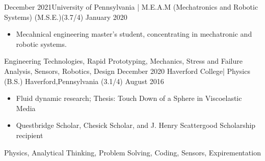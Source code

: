 %
%
%


\begin{experiences}
 \experience
    {December 2021}{University of Pennsylvania | M.E.A.M  (Mechatronics and Robotic Systems) }{(M.S.E.)}{(3.7/4)}
    {January 2020} {
                      \begin{itemize}
                        \item Mecahnical engineering master's student, concentrating in mechatronic and robotic systems.                                                                            
                      \end{itemize}
                    }
                     {Engineering Technologies, Rapid Prototyping, Mechanics, Stress and Failure Analysis, Sensors, Robotics, Design}
  \emptySeparator
  \experience
    {December 2020}   {Haverford College| Physics (B.S.) }{Haverford,Pennsylvania }{(3.1/4)}
    {August 2016} {
                      \begin{itemize}
    			    \item Fluid dynamic research; Thesis: Touch Down of a Sphere in Viscoelastic Media     	
                        \item Questbridge Scholar, Chesick Scholar, and  J. Henry Scattergood Scholarship recipient                                                        
                      \end{itemize}
                    }
                     {Physics, Analytical Thinking, Problem Solving, Coding, Sensors, Expirementation}
  \emptySeparator
 
\end{experiences}


